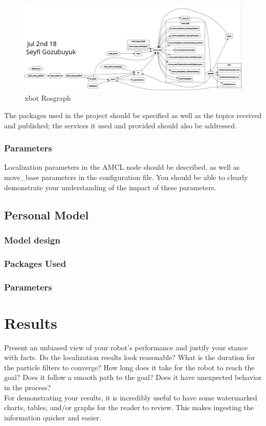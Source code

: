 \documentclass[10pt,journal,compsoc]{IEEEtran}
\begin{document}
\begin{figure}[thpb]
      \centering
      \includegraphics[width=\linewidth]{figures/rosgraph_xbot.png}
      \caption{xbot Rosgraph}
      \label{fig:xbotgrp}
\end{figure}



The packages used in the project should be specified as well as the topics received and published; the services it used and provided should also be addressed.

\subsubsection{Parameters}
Localization parameters in the AMCL node should be described, as well as move\_base parameters in the configuration file. You should be able to clearly demonstrate your understanding of the impact of these parameters.

\subsection{Personal Model}
\subsubsection{Model design}
\subsubsection{Packages Used}
\subsubsection{Parameters}


\section{Results}
Present an unbiased view of your robot's performance and justify your stance with facts. Do the localization results look reasonable? What is the duration for the particle filters to converge? How long does it take for the robot to reach the goal? Does it follow a smooth path to the goal? Does it have unexpected behavior in the process? \\
For demonstrating your results, it is incredibly useful to have some watermarked charts, tables, and/or graphs for the reader to review. This makes ingesting the information quicker and easier.
\end{document}
